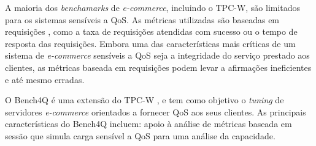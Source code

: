 


A maioria dos \textit{benchamarks} de \textit{e-commerce}, incluindo o TPC-W, são limitados para os sistemas sensíveis a QoS. As métricas utilizadas são baseadas em requisições , como a taxa de requisições atendidas com sucesso ou o tempo de resposta das requisições. Embora uma das características mais críticas de um sistema de \textit{e-commerce} sensíveis a QoS seja a integridade do serviço prestado aos clientes, as métricas baseada em requisições podem levar a afirmações ineficientes e até mesmo erradas.

O Bench4Q é uma extensão do TPC-W \cite{Menasce2002}, e tem como objetivo o \textit{tuning} de servidores \textit{e-commerce} orientados a fornecer QoS aos seus clientes. As principais características do Bench4Q incluem: 
apoio à análise de métricas baseada em sessão que simula carga sensível a QoS para uma análise da capacidade. 

